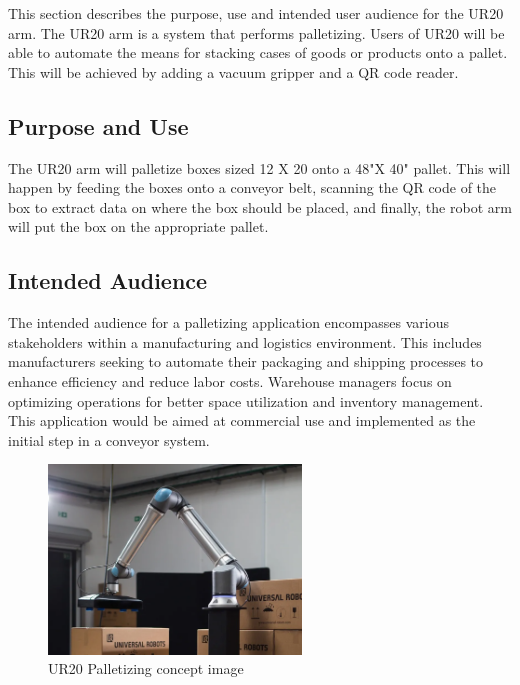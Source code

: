 This section describes the purpose, use and intended user audience for the UR20 arm. The UR20 arm is a system that performs palletizing. Users of UR20 will be able to automate the means for stacking cases of goods or products onto a pallet. This will be achieved by adding a vacuum gripper and a QR code reader.

\subsection{Purpose and Use}
The UR20 arm will palletize boxes sized 12 X 20 onto a 48"X 40" pallet. This will happen by feeding the boxes onto a conveyor belt, scanning the QR code of the box to extract data on where the box should be placed, and finally, the robot arm will put the box on the appropriate pallet.


\subsection{Intended Audience}
The intended audience for a palletizing application encompasses various stakeholders within a manufacturing and logistics environment. This includes manufacturers seeking to automate their packaging and shipping processes to enhance efficiency and reduce labor costs. Warehouse managers focus on optimizing operations for better space utilization and inventory management. This application would be aimed at commercial use and implemented as the initial step in a conveyor system.
\begin{figure}[h!]
	\centering
   	\includegraphics[width=0.60\textwidth]{images/UR20}
    \caption{UR20 Palletizing concept image}
\end{figure}